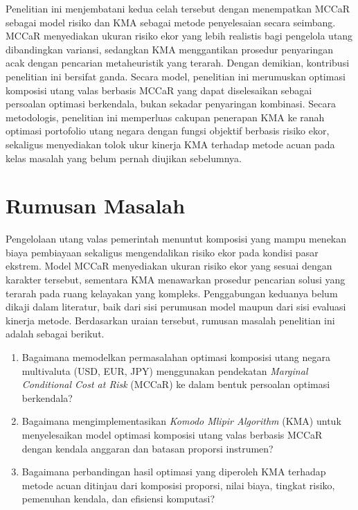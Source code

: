 
Penelitian ini menjembatani kedua celah tersebut dengan menempatkan MCCaR sebagai model risiko dan KMA sebagai metode penyelesaian secara seimbang. MCCaR menyediakan ukuran risiko ekor yang lebih realistis bagi pengelola utang dibandingkan variansi, sedangkan KMA menggantikan prosedur penyaringan acak dengan pencarian metaheuristik yang terarah. Dengan demikian, kontribusi penelitian ini bersifat ganda. Secara model, penelitian ini merumuskan optimasi komposisi utang valas berbasis MCCaR yang dapat diselesaikan sebagai persoalan optimasi berkendala, bukan sekadar penyaringan kombinasi. Secara metodologis, penelitian ini memperluas cakupan penerapan KMA ke ranah optimasi portofolio utang negara dengan fungsi objektif berbasis risiko ekor, sekaligus menyediakan tolok ukur kinerja KMA terhadap metode acuan pada kelas masalah yang belum pernah diujikan sebelumnya.


\section{Rumusan Masalah}
\label{sec:rumusan-masalah}
Pengelolaan utang valas pemerintah menuntut komposisi yang mampu menekan biaya pembiayaan sekaligus mengendalikan risiko ekor pada kondisi pasar ekstrem. Model MCCaR menyediakan ukuran risiko ekor yang sesuai dengan karakter tersebut, sementara KMA menawarkan prosedur pencarian solusi yang terarah pada ruang kelayakan yang kompleks. Penggabungan keduanya belum dikaji dalam literatur, baik dari sisi perumusan model maupun dari sisi evaluasi kinerja metode. Berdasarkan uraian tersebut, rumusan masalah penelitian ini adalah sebagai berikut.
\begin{enumerate}
  \item Bagaimana memodelkan permasalahan optimasi komposisi utang negara multivaluta (USD, EUR, JPY) menggunakan pendekatan \textit{Marginal Conditional Cost at Risk} (MCCaR) ke dalam bentuk persoalan optimasi berkendala?
  \item Bagaimana mengimplementasikan \textit{Komodo Mlipir Algorithm} (KMA) untuk menyelesaikan model optimasi komposisi utang valas berbasis MCCaR dengan kendala anggaran dan batasan proporsi instrumen?
  \item Bagaimana perbandingan hasil optimasi yang diperoleh KMA terhadap metode acuan ditinjau dari komposisi proporsi, nilai biaya, tingkat risiko, pemenuhan kendala, dan efisiensi komputasi?
\end{enumerate}

